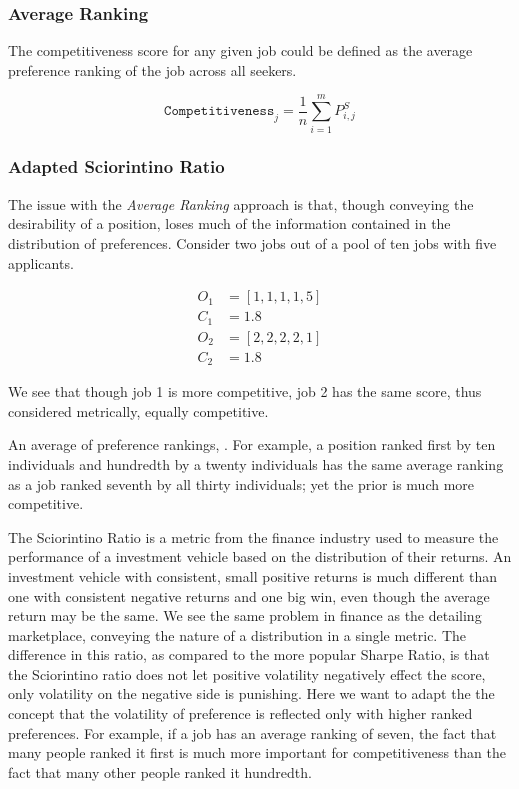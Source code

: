 \subsubsection{Average Ranking}

The competitiveness score for any given job could be defined as the average preference ranking of the job across all seekers.

\[\texttt{Competitiveness}_j = \frac{1}{n} \sum_{i=1}^m P^S_{i,j}\]

\subsubsection{Adapted Sciorintino Ratio}

The issue with the \textit{Average Ranking} approach is that, though conveying the desirability of a position, loses much of the information contained in the distribution of preferences. Consider two jobs out of a pool of ten jobs with five applicants.

\begin{align}
O_1 &= [1,1,1,1,5] \\
C_1 &= 1.8\\
O_2 &= [2,2,2,2,1] \\
C_2 &= 1.8
\end{align}

We see that though job 1 is more competitive, job 2 has the same score, thus considered metrically, equally competitive.

An average of preference rankings, . For example, a position ranked first by ten individuals and hundredth by a twenty individuals has the same average ranking as a job ranked seventh by all thirty individuals; yet the prior is much more competitive. 

The Sciorintino Ratio is a metric from the finance industry used to measure the performance of a investment vehicle based on the distribution of their returns. An investment vehicle with consistent, small positive returns is much different than one with consistent negative returns and one big win, even though the average return may be the same. We see the same problem in finance as the detailing marketplace, conveying the nature of a distribution in a single metric. The difference in this ratio, as compared to the more popular Sharpe Ratio, is that the Sciorintino ratio does not let positive volatility negatively effect the score, only volatility on the negative side is punishing. Here we want to adapt the the concept that the volatility of preference is reflected only with higher ranked preferences. For example, if a job has an average ranking of seven, the fact that many people ranked it first is much more important for competitiveness than the fact that many other people ranked it hundredth.


